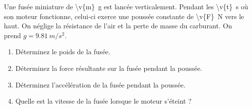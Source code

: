 Une fusée miniature de \qty{\v{m}}{g} est lancée verticalement. Pendant les \qty{\v{t}}{s} où son moteur fonctionne, celui-ci exerce une poussée constante de \qty{\v{F}}{N} vers le haut. On néglige la résistance de l'air et la perte de masse du carburant. On prend $g = \qty{9.81}{m/s^2}$.

\begin{enumerate}[label=\alph*)]
    \item Déterminez le poids de la fusée.
    \item Déterminez la force résultante sur la fusée pendant la poussée.
    \item Déterminez l'accélération de la fusée pendant la poussée.
    \item Quelle est la vitesse de la fusée lorsque le moteur s'éteint ?
\end{enumerate}
